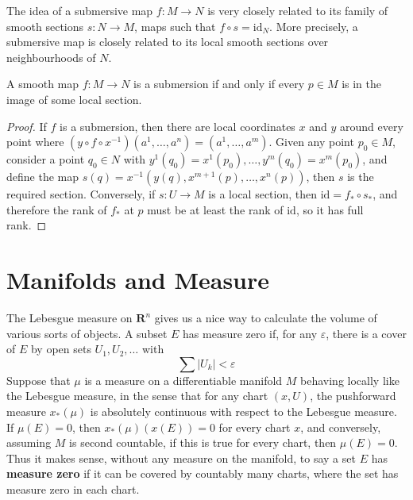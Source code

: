 The idea of a submersive map $f: M \to N$ is very closely related to its family of smooth sections $s: N \to M$, maps such that $f \circ s = \text{id}_N$. More precisely, a submersive map is closely related to its local smooth sections over neighbourhoods of $N$.

\begin{theorem}
    A smooth map $f: M \to N$ is a submersion if and only if every $p \in M$ is in the image of some local section.
\end{theorem}
\begin{proof}
    If $f$ is a submersion, then there are local coordinates $x$ and $y$ around every point where $(y \circ f \circ x^{-1})(a^1, \dots, a^n) = (a^1, \dots, a^m)$. Given any point $p_0 \in M$, consider a point $q_0 \in N$ with $y^1(q_0) = x^1(p_0), \dots, y^m(q_0) = x^m(p_0)$, and define the map $s(q) = x^{-1}(y(q), x^{m+1}(p), \dots, x^n(p))$, then $s$ is the required section. Conversely, if $s: U \to M$ is a local section, then $\text{id} = f_* \circ s_*$, and therefore the rank of $f_*$ at $p$ must be at least the rank of $\text{id}$, so it has full rank.
\end{proof}

\section{Manifolds and Measure}

The Lebesgue measure on $\mathbf{R}^n$ gives us a nice way to calculate the volume of various sorts of objects. A subset $E$ has measure zero if, for any $\varepsilon$, there is a cover of $E$ by open sets $U_1, U_2, \dots$ with
%
\[ \sum |U_k| < \varepsilon \]
%
Suppose that $\mu$ is a measure on a differentiable manifold $M$ behaving locally like the Lebesgue measure, in the sense that for any chart $(x,U)$, the pushforward measure $x_*(\mu)$ is absolutely continuous with respect to the Lebesgue measure. If $\mu(E) = 0$, then $x_*(\mu)(x(E)) = 0$ for every chart $x$, and conversely, assuming $M$ is second countable, if this is true for every chart, then $\mu(E) = 0$. Thus it makes sense, without any measure on the manifold, to say a set $E$ has {\bf measure zero} if it can be covered by countably many charts, where the set has measure zero in each chart.


